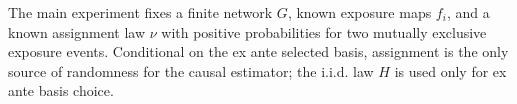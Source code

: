 The main experiment fixes a finite network \(G\), known exposure maps \(f_i\), and a known assignment law \(\nu\) with positive probabilities for two mutually exclusive exposure events.  Conditional on the ex ante selected basis, assignment is the only source of randomness for the causal estimator; the i.i.d. law \(H\) is used only for ex ante basis choice.